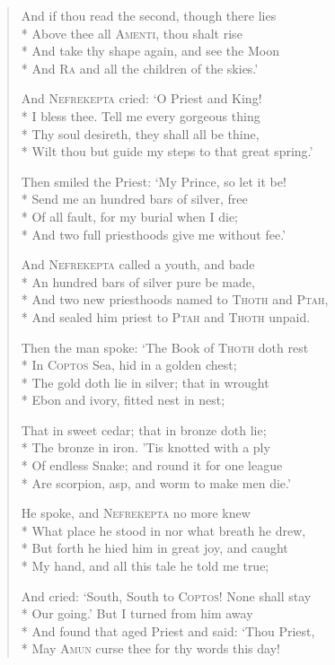 \documentclass[12pt]{article}
\newcommand{\vin}{\hspace{1em}}
\begin{document}
\begin{verse}
And if thou read the second, though there lies\\*
Above thee all \textsc{Amenti}, thou shalt rise\\*
\vin And take thy shape again, and see the Moon\\*
And \textsc{Ra} and all the children of the skies.'

And \textsc{Nefrekepta} cried: `O Priest and King!\\*
I bless thee. Tell me every gorgeous thing\\*
\vin Thy soul desireth, they shall all be thine,\\*
Wilt thou but guide my steps to that great spring.'

Then smiled the Priest: `My Prince, so let it be!\\*
Send me an hundred bars of silver, free\\*
\vin Of all fault, for my burial when I die;\\*
And two full priesthoods give me without fee.'

And \textsc{Nefrekepta} called a youth, and bade\\*
An hundred bars of silver pure be made,\\*
\vin And two new priesthoods named to \textsc{Thoth} and \textsc{Ptah},\\*
And sealed him priest to \textsc{Ptah} and \textsc{Thoth} unpaid.

Then the man spoke: `The Book of \textsc{Thoth} doth rest\\*
In \textsc{Coptos} Sea, hid in a golden chest;\\*
\vin The gold doth lie in silver; that in wrought\\*
Ebon and ivory, fitted nest in nest;

That in sweet cedar; that in bronze doth lie;\\*
The bronze in iron. 'Tis knotted with a ply\\*
\vin Of endless Snake; and round it for one league\\*
Are scorpion, asp, and worm to make men die.'

He spoke, and \textsc{Nefrekepta} no more knew\\*
What place he stood in nor what breath he drew,\\*
\vin But forth he hied him in great joy, and caught\\*
My hand, and all this tale he told me true;

And cried: `South, South to \textsc{Coptos}! None shall stay\\*
Our going.' But I turned from him away\\*
\vin And found that aged Priest and said: `Thou Priest,\\*
May \textsc{Amun} curse thee for thy words this day!


\end{verse}
\end{document}
